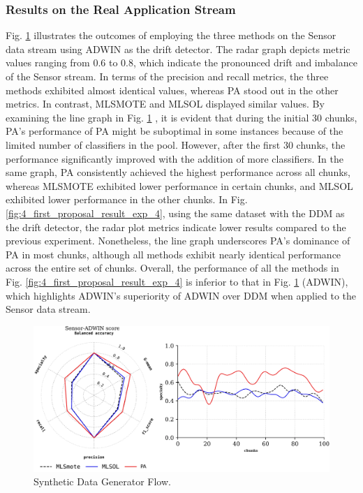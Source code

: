 \subsubsection{Results on the Real Application Stream}
Fig. \ref{fig:4_first_proposal_result_exp_3} illustrates the outcomes of employing the three methods on the Sensor data stream using ADWIN as the drift detector. The radar graph depicts metric values ranging from 0.6 to 0.8, which indicate the pronounced drift and imbalance of the Sensor stream. In terms of the precision and recall metrics, the three methods exhibited almost identical values, whereas PA stood out in the other metrics. In contrast, MLSMOTE and MLSOL displayed similar values. By examining the line graph in Fig. \ref{fig:4_first_proposal_result_exp_3}
, it is evident that during the initial 30 chunks, PA's performance of PA might be suboptimal in some instances because of the limited number of classifiers in the pool. However, after the first 30 chunks, the performance significantly improved with the addition of more classifiers. In the same graph, PA consistently achieved the highest performance across all chunks, whereas MLSMOTE exhibited lower performance in certain chunks, and MLSOL exhibited lower performance in the other chunks. In Fig. \ref{fig:4_first_proposal_result_exp_4}, using the same dataset with the DDM as the drift detector, the radar plot metrics indicate lower results compared to the previous experiment. Nonetheless, the line graph underscores PA's dominance of PA in most chunks, although all methods exhibit nearly identical performance across the entire set of chunks. Overall, the performance of all the methods in Fig. \ref{fig:4_first_proposal_result_exp_4} is inferior to that in Fig. \ref{fig:4_first_proposal_result_exp_3} (ADWIN), which highlights ADWIN's superiority of ADWIN over DDM when applied to the Sensor data stream. 


\begin{figure}[!ht]
	\centering
	\includegraphics[width=1\linewidth]{4_Taxonomy/figures/exp_3.png}
	\caption{Synthetic Data Generator Flow.}
	\label{fig:4_first_proposal_result_exp_3}
\end{figure}

